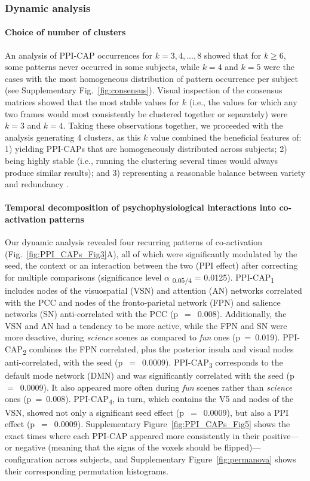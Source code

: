 \subsubsection{Dynamic analysis} 

\paragraph{Choice of number of clusters} An analysis of PPI-CAP occurrences for  $k={3,4,...,8}$ showed that for $k\geq 6$, some patterns never occurred in some subjects, while $k=4$ and $k=5$ were the cases with the most homogeneous distribution of pattern occurrence per subject (see Supplementary Fig.~\ref{fig:consensus}). Visual inspection of the consensus matrices showed that the most stable values for $k$ (i.e., the values for which any two frames would most consistently be clustered together or separately) were $k=3$ and $k=4$. Taking these observations together, we proceeded with the analysis generating 4 clusters, as this $k$ value combined the beneficial features of: 1) yielding PPI-CAPs that are homogeneously distributed across subjects; 2) being highly stable (i.e., running the clustering several times would always produce similar results); and 3) representing a reasonable balance between variety and redundancy \citep{Liu2013}.



\paragraph{Temporal decomposition of psychophysiological interactions into co-activation patterns} Our dynamic analysis revealed four recurring patterns of co-activation (Fig.~\ref{fig:PPI_CAPs_Fig3}A), all of which were significantly modulated by the seed, the context or an interaction between the two (PPI effect) after correcting for multiple comparisons (significance level $\alpha$ \textsubscript{$0.05/4$} = 0.0125). 
PPI-CAP\textsubscript{1} includes nodes of the visuospatial (VSN) and attention (AN) networks correlated with the PCC and nodes of the fronto-parietal network (FPN) and salience networks (SN) anti-correlated with the PCC (p~$=$~0.008). Additionally, the VSN and AN had a tendency to be more active, while the FPN and SN were more deactive,  during \textit{science} scenes as compared to \textit{fun} ones (p~=~0.019). PPI-CAP\textsubscript{2} combines the FPN correlated, plus the posterior insula and visual nodes anti-correlated, with the seed (p~$=$~0.0009). PPI-CAP\textsubscript{3} corresponds to the default mode network (DMN) and was significantly correlated with the seed (p~$=$~0.0009). It also appeared more often during \textit{fun} scenes rather than \textit{science} ones (p~=~0.008). PPI-CAP\textsubscript{4}, in turn, which contains the V5 and nodes of the VSN, showed not only a significant seed effect (p~$=$~0.0009), but also a PPI effect (p~$=$~0.0009).  Supplementary Figure~\ref{fig:PPI_CAPs_Fig5} shows the exact times where each PPI-CAP appeared more consistently in their positive---or negative (meaning that the signs of the voxels should be flipped)---configuration across subjects, and  Supplementary Figure~\ref{fig:permanova} shows their corresponding permutation histograms. 


